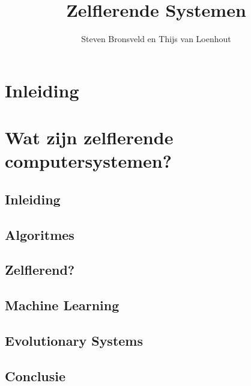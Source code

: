 \documentclass[a4paper]{article}
\title{Zelflerende Systemen}
\author{Steven Bronsveld en Thijs van Loenhout}
\begin{document}
\maketitle

\section{Inleiding}

\section{Wat zijn zelflerende computersystemen?}

\subsection{Inleiding}



\subsection{Algoritmes}

\subsection{Zelflerend?}

\subsection{Machine Learning}

\subsection{Evolutionary Systems}

\subsection{Conclusie}
\end{document}
